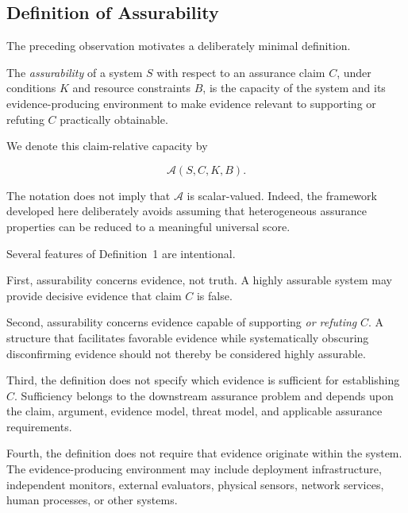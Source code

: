 \subsection{Definition of Assurability}
\label{aa.subsec.definition-assurability}

The preceding observation motivates a deliberately minimal definition.

\begin{definition}[Assurability]
  \label{se320.def.Assurability}
  The \emph{assurability} of a system \(S\) with respect to an assurance
  claim \(C\), under conditions \(K\) and resource constraints \(B\),
  is the capacity of the system and its evidence-producing environment
  to make evidence relevant to supporting or refuting \(C\)
  practically obtainable.
\end{definition}

We denote this claim-relative capacity by

\begin{equation}
  \mathcal{A}(S,C,K,B).
  \label{eq:assurability}
\end{equation}

The notation does not imply that \(\mathcal{A}\) is scalar-valued.
Indeed, the framework developed here deliberately avoids assuming
that heterogeneous assurance properties can be reduced to a meaningful
universal score.

Several features of Definition~1 are intentional.

First, assurability concerns evidence, not truth.
A highly assurable system may provide decisive evidence that claim \(C\)
is false.

Second, assurability concerns evidence capable of supporting
\emph{or refuting} \(C\).
A structure that facilitates favorable evidence while systematically
obscuring disconfirming evidence should not thereby be considered
highly assurable.

Third, the definition does not specify which evidence is sufficient
for establishing \(C\).
Sufficiency belongs to the downstream assurance problem and depends
upon the claim, argument, evidence model, threat model, and applicable
assurance requirements.

Fourth, the definition does not require that evidence originate within
the system.
The evidence-producing environment may include deployment infrastructure,
independent monitors, external evaluators, physical sensors, network
services, human processes, or other systems.

